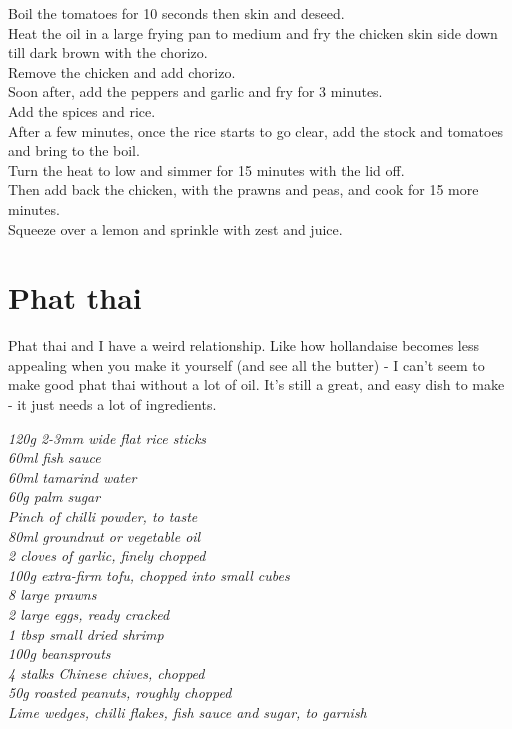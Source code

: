 \documentclass{tufte-book}
\begin{document}
\smallskip
Boil the tomatoes for 10 seconds then skin and deseed.
\\Heat the oil in a large frying pan to medium and fry the chicken skin side down till dark brown with the chorizo.
\\Remove the chicken and add chorizo.
\\Soon after, add the peppers and garlic and fry for 3 minutes.
\\Add the spices and rice.
\\After a few minutes, once the rice starts to go clear, add the stock and tomatoes and bring to the boil.
\\Turn the heat to low and simmer for 15 minutes with the lid off.
\\Then add back the chicken, with the prawns and peas, and cook for 15 more minutes.
\\Squeeze over a lemon and sprinkle with zest and juice.


\newpage

\section{Phat thai}

Phat thai and I have a weird relationship. Like how hollandaise becomes less appealing when you make it yourself (and see all the butter) - I can't seem to make good phat thai without a lot of oil. It's still a great, and easy dish to make - it just needs a lot of ingredients.

\smallskip
\emph{120g 2-3mm wide flat rice sticks
\\60ml fish sauce
\\60ml tamarind water
\\60g palm sugar
\\Pinch of chilli powder, to taste
\\80ml groundnut or vegetable oil
\\2 cloves of garlic, finely chopped
\\100g extra-firm tofu, chopped into small cubes
\\8 large prawns
\\2 large eggs, ready cracked
\\1 tbsp small dried shrimp
\\100g beansprouts
\\4 stalks Chinese chives, chopped
\\50g roasted peanuts, roughly chopped
\\Lime wedges, chilli flakes, fish sauce and sugar, to garnish}
\end{document}
